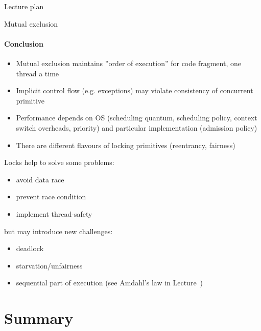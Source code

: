 \begin{frame}{Lecture plan}
\tableofcontents
\end{frame}






\begin{frame}{Mutual exclusion}
\framesubtitle{Conclusion}

\begin{itemize}
    \item Mutual exclusion maintains ''order of execution'' for code fragment, one thread a time
    \item Implicit control flow (e.g. exceptions) may violate consistency of concurrent primitive
    \item Performance depends on OS (scheduling quantum, scheduling policy, context switch overheads, priority) and particular implementation (admission policy)
    \item There are different flavours of locking primitives (reentrancy, fairness)
\end{itemize}

Locks help to solve some problems:
\begin{itemize}
    \item avoid data race
    \item prevent race condition
    \item implement thread-safety
\end{itemize}
but may introduce new challenges:
\begin{itemize}
    \item deadlock
    \item starvation/unfairness
    \item sequential part of execution (see Amdahl's law in Lecture~\introNum)
\end{itemize}
\end{frame}




\section{Summary}

